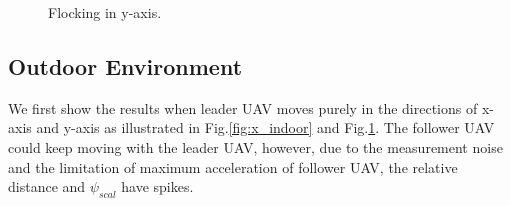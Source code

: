 \begin{figure}[htb]
  \caption{Flocking in y-axis.}\label{fig:y_indoor}
\end{figure}

\subsection{Outdoor Environment}

We first show the results when leader UAV moves purely in the directions of x-axis and y-axis as illustrated in Fig.\ref{fig:x_indoor} and Fig.\ref{fig:y_indoor}. The follower UAV could keep moving with the leader UAV, however, due to the measurement noise and the limitation of maximum acceleration of follower UAV, the relative distance and $\psi_{scal}$ have spikes.

